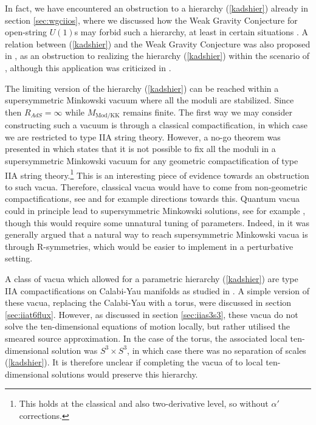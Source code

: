 \documentclass[11pt,a4paper]{article}
\numberwithin{equation}{section}
\numberwithin{table}{section}\setlength{\multlinegap}{25pt}
\begin{document}
{In fact, we have encountered an obstruction to a hierarchy (\ref{kadshier}) already in section \ref{sec:wgciios}, where we discussed how the Weak Gravity Conjecture for open-string $U(1)$s may forbid such a hierarchy, at least in certain situations \cite{ArkaniHamed:2006dz}. A relation between (\ref{kadshier}) and the Weak Gravity Conjecture was also proposed in \cite{Moritz:2018sui}, as an obstruction to realizing the hierarchy (\ref{kadshier}) within the scenario of \cite{Kallosh:2004yh}, although this application was criticized in \cite{Kallosh:2019axr}.

The limiting version of the hierarchy (\ref{kadshier}) can be reached within a supersymmetric Minkowski vacuum where all the moduli are stabilized. Since then $R_{AdS} = \infty$ while $M_{\mathrm{Mod/KK}}$ remains finite. The first way we may consider constructing such a vacuum is through a classical compactification, in which case we are restricted to type IIA string theory. However, a no-go theorem was presented in \cite{Micu:2007rd} which states that it is not possible to fix all the moduli in a supersymmetric Minkowski vacuum for any geometric compactification of type IIA string theory.\footnote{This holds at the classical and also two-derivative level, so without $\alpha'$ corrections.} This is an interesting piece of evidence towards an obstruction to such vacua. Therefore, classical vacua would have to come from non-geometric compactifications, see \cite{Palti:2007pm} and \cite{Becker:2006ks} for example directions towards this. Quantum vacua could in principle lead to supersymmetric Minkowski solutions, see for example \cite{Kallosh:2004yh}, though this would require some unnatural tuning of parameters. Indeed, in \cite{Dine:2005gz} it was generally argued that a natural way to reach supersymmetric Minkowski vacua is through R-symmetries, which would be easier to implement in a perturbative setting.
 
A class of vacua which allowed for a parametric hierarchy (\ref{kadshier}) are type IIA compactifications on Calabi-Yau manifolds as studied in \cite{DeWolfe:2005uu}. A simple version of these vacua, replacing the Calabi-Yau with a torus, were discussed in section \ref{sec:iiat6flux}. However, as discussed in section \ref{sec:iias3s3}, these vacua do not solve the ten-dimensional equations of motion locally, but rather utilised the smeared source approximation. In the case of the torus, the associated local ten-dimensional solution was $S^3 \times S^3$, in which case there was no separation of scales (\ref{kadshier}). It is therefore unclear if completing the vacua of \cite{DeWolfe:2005uu} to local ten-dimensional solutions would preserve this hierarchy. 

}
\end{document}
